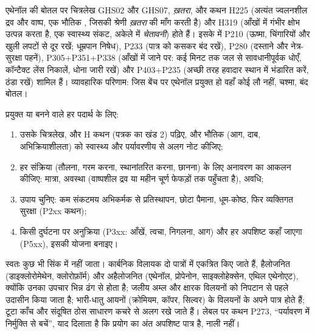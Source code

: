 \begin{example}[एथेनॉल का लेबल पढ़ना]
एथेनॉल की बोतल पर चित्रलेख GHS02 और GHS07,  \emph{ख़तरा}, और कथन H225 (अत्यंत ज्वलनशील द्रव और
वाष्प, एक भौतिक , जिसकी श्रेणी \emph{ख़तरा} की माँग करती है) और H319
(आँखों में गंभीर क्षोभ उत्पन्न करता है, एक स्वास्थ्य संकट, अकेले में \emph{चेतावनी}) होते हैं।
इसके  में P210 (ऊष्मा, चिंगारियों और
खुली लपटों से दूर रखें; धूम्रपान निषेध), P233 (पात्र को कसकर बंद रखें), P280
(दस्ताने और नेत्र-सुरक्षा पहनें), P305+P351+P338 (आँखों में जाने पर: कई मिनट तक
जल से सावधानीपूर्वक धोएँ, कॉन्टैक्ट लेंस निकालें, धोना
जारी रखें) और P403+P235 (अच्छी तरह हवादार स्थान में भंडारित करें, ठंडा रखें) शामिल हैं।
व्यावहारिक परिणाम: जिस बेंच पर एथेनॉल प्रयुक्त हो वहाँ कोई लौ नहीं,
चश्मा, बंद बोतल।
\end{example}

\begin{method}[सुरक्षा आँकड़ा पत्रकों से एक सत्र की तैयारी]\label{met:b1:lab-techniques-1:read-sds}
प्रयुक्त या बनने वाले हर पदार्थ के लिए:
\begin{enumerate}
  \item उसके चित्रलेख,  और H कथन (पत्रक का खंड 2)
        पढ़िए, और भौतिक  (आग, दाब,
        अभिक्रियाशीलता) को स्वास्थ्य और पर्यावरणीय  से अलग नोट कीजिए;
  \item हर संक्रिया (तौलना, गरम करना, स्थानांतरित करना, छानना) के लिए
        अनावरण का आकलन कीजिए: मात्रा, अवस्था (वाष्पशील द्रव या
        महीन चूर्ण फेफड़ों तक पहुँचता है), अवधि;
  \item उपाय चुनिए: कम संकटमय अभिकर्मक से प्रतिस्थापन,
        छोटा पैमाना, धूम-कोष्ठ, फिर व्यक्तिगत सुरक्षा (P2xx
        कथन);
  \item किसी दुर्घटना पर अनुक्रिया (P3xx: आँखें, त्वचा, निगलना,
        आग) और हर अपशिष्ट कहाँ जाएगा (P5xx), इसकी योजना बनाइए।
\end{enumerate}
\end{method}

\begin{inthelab}[अपशिष्ट]
स्वतः कुछ भी सिंक में नहीं जाता। कार्बनिक विलायक
दो पात्रों में एकत्रित किए जाते हैं, हैलोजनित (डाइक्लोरोमेथेन, क्लोरोफ़ॉर्म) और
अहैलोजनित (एथेनॉल, प्रोपेनोन, साइक्लोहेक्सेन, एथिल एथेनोएट), क्योंकि
उनका उपचार भिन्न ढंग से होता है; जलीय अम्ल और क्षारक विलयनों को निपटान से पहले
उदासीन किया जाता है; भारी-धातु आयनों (क्रोमियम,
कॉपर, सिल्वर) के विलयनों के अपने पात्र होते हैं; टूटा काँच और संदूषित
ठोस साधारण कचरे से अलग रखे जाते हैं। लेबल पर कथन P273, ``पर्यावरण में
निर्मुक्ति से बचें'', याद दिलाता है कि प्रयोग का अंत अपशिष्ट
पात्र है, नाली नहीं।
\end{inthelab}

